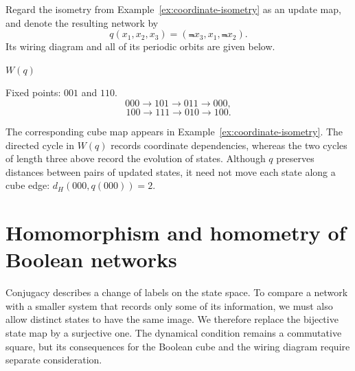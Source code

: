 \begin{example}
    Regard the isometry from Example~\ref{ex:coordinate-isometry} as an update map, and denote the resulting network by
    \[
        q(x_1,x_2,x_3)=(\Not{x}_3,x_1,\Not{x}_2).
    \]
    Its wiring diagram and all of its periodic orbits are given below.

    \begin{center}
        \begin{minipage}{0.32\linewidth}
            \centering

            \small $W(q)$
        \end{minipage}
        \hfill
        \begin{minipage}{0.64\linewidth}
            \centering
            Fixed points: $001$ and $110$.
            \[
                000\longrightarrow101\longrightarrow011\longrightarrow000,
            \]
            \[
                100\longrightarrow111\longrightarrow010\longrightarrow100.
            \]
        \end{minipage}
    \end{center}

    The corresponding cube map appears in Example~\ref{ex:coordinate-isometry}. The directed cycle in $W(q)$ records coordinate dependencies, whereas the two cycles of length three above record the evolution of states. Although $q$ preserves distances between pairs of updated states, it need not move each state along a cube edge: $d_H(000,q(000))=2$.
\end{example}


\section{Homomorphism and homometry of Boolean networks}\label{sec:semiconjugacy-contraction}



Conjugacy describes a change of labels on the state space. To compare a network with a smaller system that records only some of its information, we must also allow distinct states to have the same image. We therefore replace the bijective state map by a surjective one. The dynamical condition remains a commutative square, but its consequences for the Boolean cube and the wiring diagram require separate consideration.

